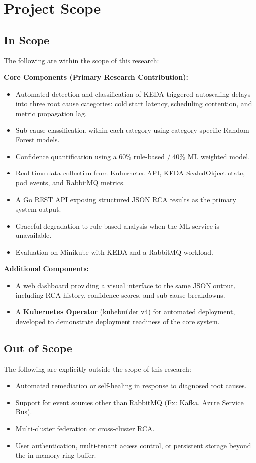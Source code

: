 \section{Project Scope}

\subsection{In Scope}
The following are within the scope of this research:

\textbf{Core Components (Primary Research Contribution):}
\begin{itemize}
    \item Automated detection and classification of KEDA-triggered autoscaling delays into three root cause categories: cold start latency, scheduling contention, and metric propagation lag.
    \item Sub-cause classification within each category using category-specific Random Forest models.
    \item Confidence quantification using a 60\% rule-based / 40\% ML weighted model.
    \item Real-time data collection from Kubernetes API, KEDA ScaledObject state, pod events, and RabbitMQ metrics.
    \item A Go REST API exposing structured JSON RCA results as the primary system output.
    \item Graceful degradation to rule-based analysis when the ML service is unavailable.
    \item Evaluation on Minikube with KEDA and a RabbitMQ workload.
\end{itemize}

\textbf{Additional Components:}
\begin{itemize}
    \item A web dashboard providing a visual interface to the same JSON output, including RCA history, confidence scores, and sub-cause breakdowns.
    \item A \textbf{Kubernetes Operator} (kubebuilder v4) for automated deployment, developed to demonstrate deployment readiness of the core system.
\end{itemize}

\subsection{Out of Scope}
The following are explicitly outside the scope of this research:
\begin{itemize}
    \item Automated remediation or self-healing in response to diagnosed root causes.
    \item Support for event sources other than RabbitMQ (Ex: Kafka, Azure Service Bus).
    \item Multi-cluster federation or cross-cluster RCA.
    \item User authentication, multi-tenant access control, or persistent storage beyond the in-memory ring buffer.
\end{itemize}

